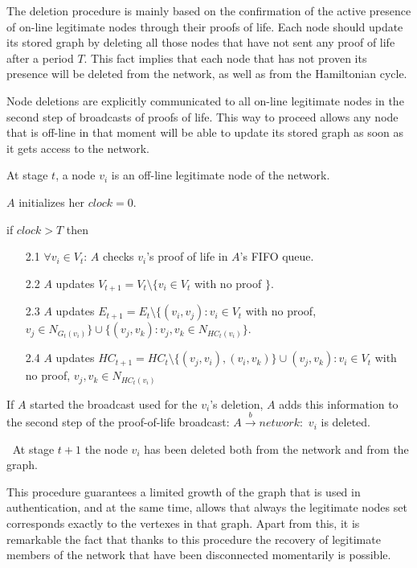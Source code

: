 \documentclass[conference]{IEEEtran}
\begin{document}
The deletion procedure is mainly based on the confirmation of the
active presence of on-line legitimate nodes through their proofs
of life. Each node should update its stored graph by deleting all
those nodes that have not sent any proof of life after a period
$T$. This fact implies that each node that has not proven its presence
will be deleted from the network, as well as from the Hamiltonian cycle.

Node deletions are explicitly communicated to all on-line
legitimate nodes in the second step of broadcasts of proofs of
life. This way to proceed allows any node that is off-line in that moment will
be able to update its stored graph as soon as it gets access to
the network.


\begin{description}


\item [Input:] At stage $t$, a node $v_i$ is an off-line legitimate node of the network.
\item [1.] $A$ initializes her $clock=0$.
    \item [2.] if $clock > T$ then
    \begin{enumerate}
    \item [2.1] $\forall v_i \in V_t$: $A$ checks $v_i$'s proof of life in $A$'s FIFO queue.
    \item [2.2] $A$ updates $V_{t+1}=V_t \setminus \{v_i\in V_t$ with no proof $\}$.
    \item [2.3] $A$ updates $E_{t+1}=E_t \setminus \{ (v_i, v_j): v_i \in V_t$
    with no proof, $v_j \in N_{G_t(v_i)} \} \cup \{(v_j, v_k): v_j, v_k \in N_{HC_t(v_i)} \}$.
    \item [2.4] $A$ updates $HC_{t+1}=HC_t \setminus \{(v_j, v_i), (v_i, v_k)\} \cup (v_j,v_k): v_i \in V_t$
        with no proof, $v_j, v_k \in N_{HC_t(v_i)}$
    \end{enumerate}
    \item [3.]  If $A$ started the broadcast used for the $v_i$'s deletion, $A$ adds this information
    to the second step of the proof-of-life broadcast:  $A \stackrel{b}{\rightarrow} network: $ $v_i$ is deleted.
\item [Output:] $\ $ At stage $t+1$ the node $v_i$ has been deleted both from the network and from the graph.
\end{description}


This procedure guarantees a limited growth of the graph that
is used in authentication, and at the same time, allows that
always the legitimate nodes set corresponds exactly to the
vertexes in that graph. Apart from this, it is remarkable the fact
that thanks to this procedure  the recovery of legitimate members
of the network that have been disconnected momentarily is possible.
\end{document}

